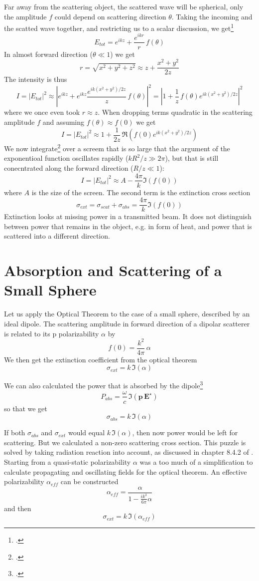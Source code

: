 Far away from the scattering object, the scattered wave will be spherical, only the amplitude $f$ could depend on scattering direction $\theta$. Taking the incoming and the scatted wave together, and restricting us to a scalar discussion, we get\footcite{Newton:1976cz}
\[
 E_{tot} =  e^{i k z} + \frac{e^{i k r}}{r} \, f(\theta)
\]
In almost forward direction ($\theta \ll 1$) we get
\[
r = \sqrt{x^2 + y^2 + z^2} \approx z + \frac{x^2 + y^2}{2z }
\]
The intensity is thus
\[
 I = |E_{tot}|^2 \approx \left|e^{i k z} + e^{i k z} \frac{e^{i k (x^2 + y^2)/2z }}{z} \, f(\theta) \right| ^2 = \left|1 + \frac{1}{z} \, f(\theta) e^{i k (x^2 + y^2)/2z } \right| ^2
\]
where we once even took $r \approx z$. When dropping terms quadratic in the scattering amplitude $f$ and assuming $f(\theta) \approx f(0)$ we get
\[
 I = |E_{tot}|^2 \approx 1 +   \frac{1}{2 z} \, \Re  \left( f(0) e^{i k (x^2 + y^2)/2z } \right)
\]
We now integrate\footcite{Newton:1976cz} over a screem that is so large that the argument of the exponentioal function oscillates rapidly ($k R^2 / z \gg 2 \pi$), but that is still conecntrated along the forward direction ($R/z \ll 1$):
\[
 I = |E_{tot}|^2 \approx A  - \frac{4 \pi }{k} \Im ( f(0) )
\]
where $A$ is the size of the screen. The second term is the extinction cross section
\[
 \sigma_{ext} = \sigma_{scat}  + \sigma_{abs}  = \frac{4 \pi }{k} \Im ( f(0) )
\]
Extinction looks at missing power in a transmitted beam. It does not distinguish between power that remains in the object, e.g. in form of heat, and power that is scattered into a different direction.


\section{Absorption and Scattering of a Small Sphere}

Let us apply the Optical Theorem to the case of a small sphere, described by an ideal dipole.
The scattering amplitude in forward direction of a dipolar scatterer is related to its p polarizability $\alpha$ by 
\[
 f(0) = \frac{k^2}{4 \pi} \, \alpha
\]
We  then get the extinction coefficient from the optical theorem
\[
 \sigma_{ext} = k \, \Im ( \alpha )
\]

We can also calculated the power that is absorbed by the dipole\footcite[Chapter 8]{Novotny-Hecht2012}
\[
 P_{abs} = \frac{\omega}{c} \, \Im \left( \mathbf{p} \, \mathbf{E}^\star \right) 
\]
so that we get 
\[
 \sigma_{abs} = k \, \Im ( \alpha )
\]

If both $\sigma_{abs}$ and $\sigma_{ext}$  would equal $ k \, \Im ( \alpha )$, then now power would be left for scattering. But we calculated a non-zero scattering cross section. 
This puzzle is solved by taking radiation reaction into account, as discussed in chapter 8.4.2 of \cite{Novotny-Hecht2012}. Starting from a quasi-static polarizability $\alpha$ was a too much of a simplification to calculate propagating and oscillating fields  for the optical theorem. An effective  polarizability $\alpha_{eff}$ can be constructed 
\[
 \alpha_{eff} = \frac{\alpha}{1 - \frac{i k^3 }{6 \pi} \alpha}
\]
and then 
\[
 \sigma_{ext} = k \, \Im ( \alpha_{eff} )
\]


